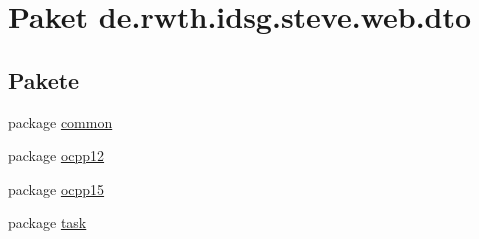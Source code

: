 \hypertarget{namespacede_1_1rwth_1_1idsg_1_1steve_1_1web_1_1dto}{\section{Paket de.\+rwth.\+idsg.\+steve.\+web.\+dto}
\label{namespacede_1_1rwth_1_1idsg_1_1steve_1_1web_1_1dto}
}
\subsection*{Pakete}
\begin{DoxyCompactItemize}
\item 
package \hyperlink{namespacede_1_1rwth_1_1idsg_1_1steve_1_1web_1_1dto_1_1common}{common}
\item 
package \hyperlink{namespacede_1_1rwth_1_1idsg_1_1steve_1_1web_1_1dto_1_1ocpp12}{ocpp12}
\item 
package \hyperlink{namespacede_1_1rwth_1_1idsg_1_1steve_1_1web_1_1dto_1_1ocpp15}{ocpp15}
\item 
package \hyperlink{namespacede_1_1rwth_1_1idsg_1_1steve_1_1web_1_1dto_1_1task}{task}
\end{DoxyCompactItemize}
